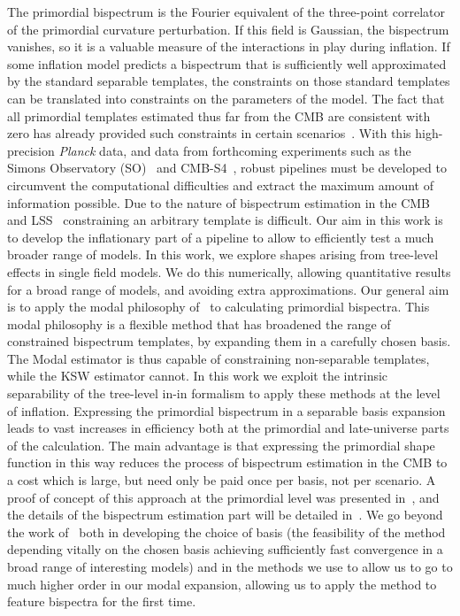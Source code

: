 \documentclass[a4paper,12pt]{extarticle}
\begin{document}
The primordial bispectrum is the Fourier equivalent of the
three-point correlator of the primordial curvature perturbation.
If this field is Gaussian, the bispectrum vanishes, so
it is a valuable measure of the interactions in play during inflation.
If some inflation model predicts a bispectrum that is sufficiently well approximated by
the standard separable templates, the constraints on those standard templates
can be translated into constraints on the parameters of the model.
The fact that all primordial templates estimated thus far from the CMB
are consistent with zero has already provided such constraints
in certain scenarios~\cite{Planck_NG_2015, Planck_NG_2018}.
With this high-precision \textit{Planck} data, and data from forthcoming experiments
such as the Simons Observatory (SO)~\cite{simons}
and CMB-S4~\cite{abazajian2016cmbs4},
robust pipelines must be developed to circumvent the computational difficulties and
extract the maximum amount of information possible.
Due to the nature of bispectrum estimation in the CMB and
LSS~\cite{lss_baldauf,lss_karagiannis,chen_future_lss,Scoccimarro_2012}
constraining an arbitrary template is difficult.
Our aim in this work is to develop the inflationary part
of a pipeline to allow to efficiently test a much broader range of models.
In this work, we explore shapes arising from tree-level effects in single field models.
We do this numerically, allowing quantitative results for a broad
range of models, and avoiding extra approximations.
Our general aim is to apply the modal philosophy of~\cite{FergShell_1,FergShell_2,FergShell_3}
to calculating primordial bispectra.
This modal philosophy is a flexible method that has broadened the range of constrained
bispectrum templates, by expanding them in a carefully chosen basis.
The Modal estimator is thus capable of constraining
non-separable templates, while the KSW estimator cannot.
In this work we exploit the intrinsic separability of the
tree-level in-in formalism to apply these methods at the level of inflation.
Expressing the primordial bispectrum in a separable
basis expansion leads to vast increases in efficiency both at the primordial
and late-universe parts of the calculation.
The main advantage is that expressing the primordial shape function
in this way reduces the process of bispectrum estimation in the CMB to a
cost which is large, but need only be paid once per basis,
not per scenario.
A proof of concept of this approach at the primordial level was presented in~\cite{Funakoshi},
and the details of the bispectrum estimation part will be detailed in~\cite{Sohn_2020}.
We go beyond the work of~\cite{Funakoshi} both in developing the choice of basis
(the feasibility of the method depending vitally on the chosen basis
achieving sufficiently fast convergence in a broad range of interesting models)
and in the methods we use to allow us to go to much higher order in our modal expansion,
allowing us to apply the method to feature bispectra for the first time.
\end{document}
